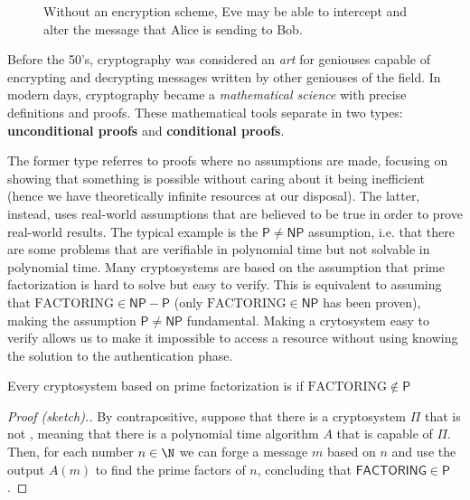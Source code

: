 \documentclass[a4paper, 12pt]{report}
\begin{document}
\begin{enumerate}
\begin{figure}[H]

            \caption{Without an encryption scheme, Eve may be able to intercept and alter the message that Alice is sending to Bob.}
        \end{figure}
    \end{enumerate}


    Before the 50's, cryptography was considered an \textit{art} for geniouses capable of encrypting and decrypting messages written by other geniouses of the field. In modern days, cryptography became a \textit{mathematical science} with precise definitions and proofs. These mathematical tools separate in two types: \textbf{unconditional proofs} and \textbf{conditional proofs}.
    
    The former type referres to proofs where no assumptions are made, focusing on showing that something is possible without caring about it being inefficient (hence we have theoretically infinite resources at our disposal). The latter, instead, uses real-world assumptions that are believed to be true in order to prove real-world results. The typical example is the $\mathsf{P} \neq \mathsf{NP}$ assumption, i.e. that there are some problems that are verifiable in polynomial time but not solvable in polynomial time. Many cryptosystems are based on the assumption that prime factorization is hard to solve but easy to verify. This is equivalent to assuming that $\mathrm{FACTORING} \in \mathsf{NP} - \mathsf{P}$ (only $\mathrm{FACTORING} \in \mathsf{NP}$ has been proven), making the assumption $\mathsf{P} \neq \mathsf{NP}$ fundamental. Making a crytosystem easy to verify allows us to make it impossible to access a resource without using knowing the solution to the authentication phase.

    \begin{framedthm}{}
        Every cryptosystem based on prime factorization is  if $\mathrm{FACTORING} \notin \mathsf{P}$
    \end{framedthm}
    
    \begin{proof}[Proof (sketch).]
        By contrapositive, suppose that there is a cryptosystem $\Pi$ that is not , meaning that there is a polynomial time algorithm $A$ that is capable of  $\Pi$. Then, for each number $n \in \N$ we can forge a message $m$ based on $n$ and use the output $A(m)$ to find the prime factors of $n$, concluding that $\mathsf{FACTORING} \in \mathsf{P}$.
    \end{proof}
    
\end{document}

